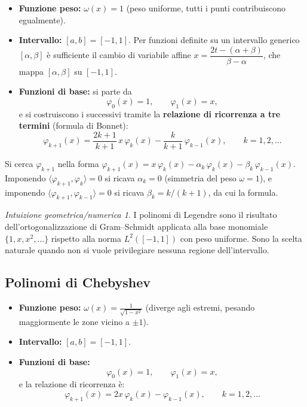 \documentclass[a4paper,12pt]{article}
\theoremstyle{definition}
\theoremstyle{remark}
\newtheorem*{intuizione}{Intuizione geometrica/numerica}
\begin{document}
\begin{itemize}
  \item \textbf{Funzione peso:} $\omega(x) = 1$ (peso uniforme, tutti i punti contribuiscono
        egualmente).
  \item \textbf{Intervallo:} $[a,b] = [-1, 1]$.
        Per funzioni definite su un intervallo generico $[\alpha,\beta]$ è sufficiente
        il cambio di variabile affine
        $x = \dfrac{2t - (\alpha+\beta)}{\beta - \alpha}$,
        che mappa $[\alpha,\beta]$ su $[-1,1]$.
  \item \textbf{Funzioni di base:} si parte da
        \[
          \varphi_0(x) = 1, \qquad \varphi_1(x) = x,
        \]
        e si costruiscono i successivi tramite la \textbf{relazione di ricorrenza a tre
        termini} (formula di Bonnet):
        \begin{equation}
          \boxed{
            \varphi_{k+1}(x)
              = \frac{2k+1}{k+1}\,x\,\varphi_k(x)
                - \frac{k}{k+1}\,\varphi_{k-1}(x),
            \qquad k = 1, 2, \ldots
          }
        \end{equation}
\end{itemize}

\begin{derivazione}
Si cerca $\varphi_{k+1}$ nella forma
$\varphi_{k+1}(x) = x\,\varphi_k(x) - \alpha_k\,\varphi_k(x) - \beta_k\,\varphi_{k-1}(x)$.
Imponendo $\langle \varphi_{k+1}, \varphi_k \rangle = 0$ si ricava $\alpha_k = 0$
(simmetria del peso $\omega = 1$), e imponendo
$\langle \varphi_{k+1}, \varphi_{k-1} \rangle = 0$ si ricava $\beta_k = k/(k+1)$,
da cui la formula.
\end{derivazione}

\begin{intuizione}
I polinomi di Legendre sono il risultato dell'ortogonalizzazione di Gram--Schmidt
applicata alla base monomiale $\{1, x, x^2, \ldots\}$ rispetto alla norma
$L^2([-1,1])$ con peso uniforme. Sono la scelta naturale quando non si vuole
privilegiare nessuna regione dell'intervallo.
\end{intuizione}

\subsection{Polinomi di Chebyshev}

\begin{itemize}
  \item \textbf{Funzione peso:} $\displaystyle\omega(x) = \frac{1}{\sqrt{1-x^2}}$
        (diverge agli estremi, pesando maggiormente le zone vicino a $\pm 1$).
  \item \textbf{Intervallo:} $[a,b] = [-1, 1]$.
  \item \textbf{Funzioni di base:}
        \[
          \varphi_0(x) = 1, \qquad \varphi_1(x) = x,
        \]
        e la relazione di ricorrenza è:
        \begin{equation}
          \boxed{
            \varphi_{k+1}(x) = 2x\,\varphi_k(x) - \varphi_{k-1}(x),
            \qquad k = 1, 2, \ldots
          }
        \end{equation}
\end{itemize}
\end{document}
